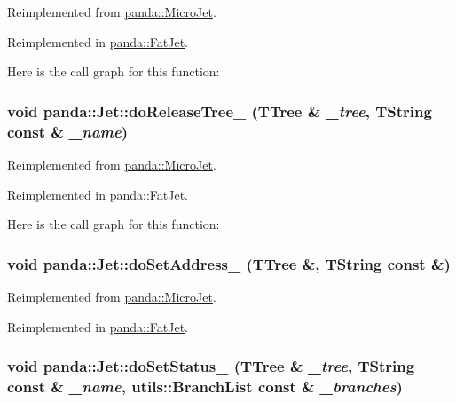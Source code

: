 Reimplemented from \hyperlink{classpanda_1_1MicroJet_a15d337ea6042caf8a37d2f4172b9ab01}{panda::MicroJet}.

Reimplemented in \hyperlink{classpanda_1_1FatJet_aae0c0b4e50cf6aae1d6c12b31d8585d9}{panda::FatJet}.

Here is the call graph for this function:\hypertarget{classpanda_1_1Jet_a3bc50ef589095a1bae03b1f4bbf74077}{
\subsubsection[{doReleaseTree\_\-}]{\setlength{\rightskip}{0pt plus 5cm}void panda::Jet::doReleaseTree\_\- (TTree \& {\em \_\-tree}, \/  TString const \& {\em \_\-name})}}
\label{classpanda_1_1Jet_a3bc50ef589095a1bae03b1f4bbf74077}


Reimplemented from \hyperlink{classpanda_1_1MicroJet_a76d94a27064103f68ac0532d7d610889}{panda::MicroJet}.

Reimplemented in \hyperlink{classpanda_1_1FatJet_a8a4681a9c643494786d131103f281aa8}{panda::FatJet}.

Here is the call graph for this function:\hypertarget{classpanda_1_1Jet_a4e59030d68ca3a27fb72f0c0976bdb27}{
\subsubsection[{doSetAddress\_\-}]{\setlength{\rightskip}{0pt plus 5cm}void panda::Jet::doSetAddress\_\- (TTree \&, \/  TString const \&)}}
\label{classpanda_1_1Jet_a4e59030d68ca3a27fb72f0c0976bdb27}


Reimplemented from \hyperlink{classpanda_1_1MicroJet_a6a8758a218f0e0ce60a1af0a999ff598}{panda::MicroJet}.

Reimplemented in \hyperlink{classpanda_1_1FatJet_a3f92ff4d7d7bb8f83fa43e4ef20bc036}{panda::FatJet}.\hypertarget{classpanda_1_1Jet_a494d27c6c2b773f5849996944cf46eb2}{
\subsubsection[{doSetStatus\_\-}]{\setlength{\rightskip}{0pt plus 5cm}void panda::Jet::doSetStatus\_\- (TTree \& {\em \_\-tree}, \/  TString const \& {\em \_\-name}, \/  {\bf utils::BranchList} const \& {\em \_\-branches})}}
\label{classpanda_1_1Jet_a494d27c6c2b773f5849996944cf46eb2}



